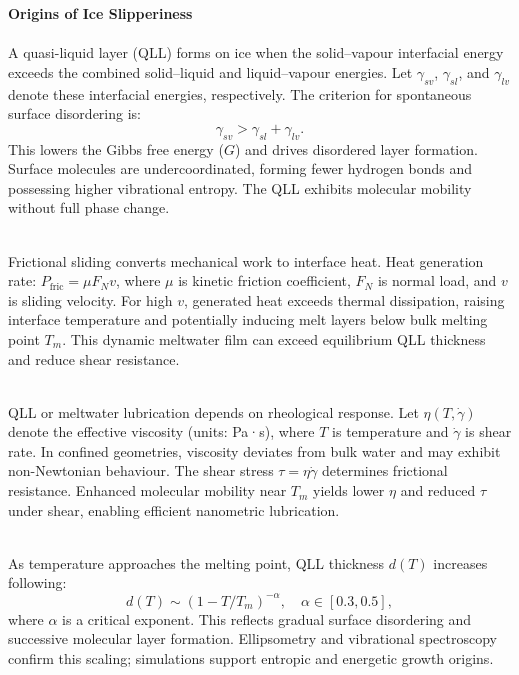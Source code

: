 \begin{technical}
{\Large\textbf{Origins of Ice Slipperiness}}\\[0.3em]

\\[0.2em]
A quasi-liquid layer (QLL) forms on ice when the solid–vapour interfacial energy exceeds the combined solid–liquid and liquid–vapour energies. Let $\gamma_{sv}$, $\gamma_{sl}$, and $\gamma_{lv}$ denote these interfacial energies, respectively. The criterion for spontaneous surface disordering is:
\[
\gamma_{sv} > \gamma_{sl} + \gamma_{lv}.
\]
This lowers the Gibbs free energy ($G$) and drives disordered layer formation. Surface molecules are undercoordinated, forming fewer hydrogen bonds and possessing higher vibrational entropy. The QLL exhibits molecular mobility without full phase change.

\\[0.5em]
Frictional sliding converts mechanical work to interface heat. Heat generation rate: $P_{\text{fric}} = \mu F_N v$, where $\mu$ is kinetic friction coefficient, $F_N$ is normal load, and $v$ is sliding velocity. For high $v$, generated heat exceeds thermal dissipation, raising interface temperature and potentially inducing melt layers below bulk melting point $T_m$. This dynamic meltwater film can exceed equilibrium QLL thickness and reduce shear resistance.

\\[0.5em]
QLL or meltwater lubrication depends on rheological response. Let $\eta(T, \dot{\gamma})$ denote the effective viscosity (units: Pa·s), where $T$ is temperature and $\dot{\gamma}$ is shear rate. In confined geometries, viscosity deviates from bulk water and may exhibit non-Newtonian behaviour. The shear stress $\tau = \eta \dot{\gamma}$ determines frictional resistance. Enhanced molecular mobility near $T_m$ yields lower $\eta$ and reduced $\tau$ under shear, enabling efficient nanometric lubrication.

\\[0.5em]
As temperature approaches the melting point, QLL thickness $d(T)$ increases following:
\[
d(T) \sim \left(1 - T/T_m \right)^{-\alpha}, \quad \alpha \in [0.3, 0.5],
\]
where $\alpha$ is a critical exponent. This reflects gradual surface disordering and successive molecular layer formation. Ellipsometry and vibrational spectroscopy confirm this scaling; simulations support entropic and energetic growth origins.


\end{technical}
